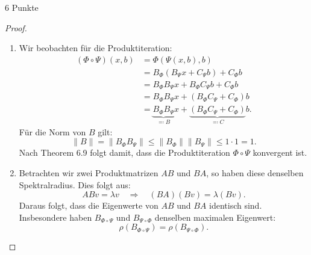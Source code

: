 \documentclass{problemset}
\begin{document}
\begin{problem}[Lemma 6.8]{6 Punkte}
\begin{proof}
\begin{enumerate}
        \item Wir beobachten für die Produktiteration:
              \begin{align*}
                  (\Phi \circ \Psi)(x, b) & = \Phi(\Psi(x, b), b)                          \\
                                          & = B_\Phi(B_\Psi x + C_\Psi b) + C_\Phi b       \\
                                          & = B_\Phi B_\Psi x + B_\Phi C_\Psi b + C_\Phi b \\
                                          & = B_\Phi B_\Psi x + (B_\Phi C_\Psi + C_\Phi) b \\
                                          & = \underbrace{B_\Phi B_\Psi}_{\eqcolon B} x
                  + \underbrace{(B_\Phi C_\Psi + C_\Phi)}_{\eqcolon C} b.
              \end{align*}
              Für die Norm von \( B \) gilt:
              \[
                  \|B\| = \|B_\Phi B_\Psi\| \leq \|B_\Phi\| \|B_\Psi\| \leq 1 \cdot 1 = 1.
              \]
              Nach Theorem 6.9 folgt damit, dass die Produktiteration \( \Phi
              \circ \Psi \) konvergent ist.

        \item Betrachten wir zwei Produktmatrizen \( AB \) und \( BA \), so
              haben diese denselben Spektralradius. Dies folgt aus:
              \[
                  ABv = \lambda v \quad \Rightarrow \quad (BA)(Bv) = \lambda (Bv).
              \]
              Daraus folgt, dass die Eigenwerte von \( AB \) und \( BA \)
              identisch sind. Insbesondere haben \( B_{\Phi \circ \Psi} \) und
              \( B_{\Psi \circ \Phi} \) denselben maximalen Eigenwert:
              \[
                  \rho(B_{\Phi \circ \Psi}) = \rho(B_{\Psi \circ \Phi}).
              \]
    \end{enumerate}
\end{proof}
\end{problem}
\end{document}

